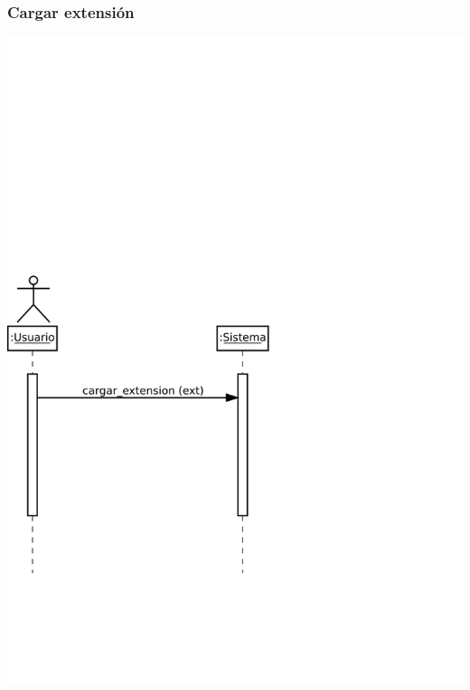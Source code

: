 \subsubsection{Cargar extensión}
\begin{center}
\includegraphics[scale=0.4]{cagar_extension.png} \\
\end{center}

